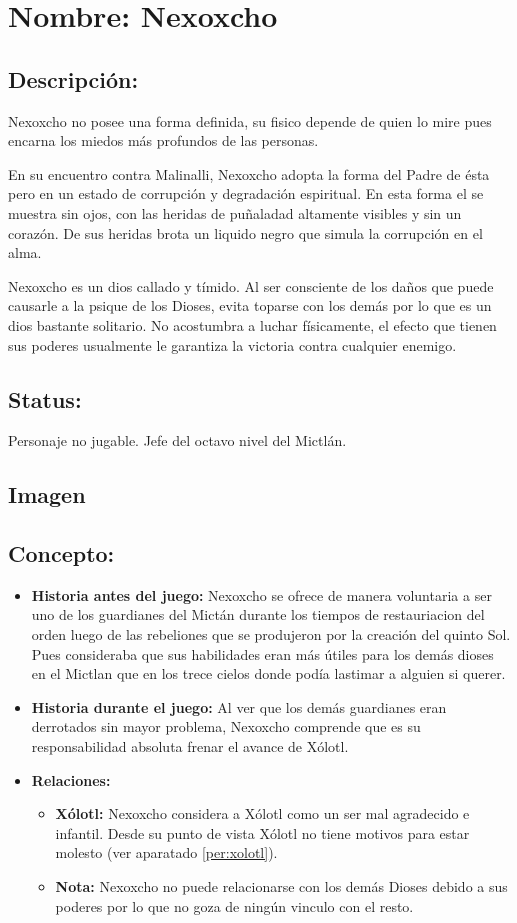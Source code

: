 \section{Nombre: Nexoxcho}  \label{per:nexoxcho}
\subsection{Descripción:}
Nexoxcho no posee una forma definida, su fisico depende de quien lo mire pues encarna los miedos más profundos de las personas.
\\
\par
En su encuentro contra Malinalli, Nexoxcho adopta la forma del Padre de ésta pero en un estado de corrupción y degradación espiritual. En esta forma el se muestra sin ojos, con las heridas de puñaladad altamente visibles y sin un corazón. De sus heridas brota un liquido negro que simula la corrupción en el alma. 
\\
\par
Nexoxcho es un dios callado y tímido. Al ser consciente de los daños que puede causarle a la psique de los Dioses, evita toparse con los demás por lo que es un dios bastante solitario. No acostumbra a luchar físicamente, el efecto que tienen sus poderes usualmente le garantiza la victoria contra cualquier enemigo.         
\subsection{Status:}
Personaje no jugable.
Jefe del octavo nivel del Mictlán.
\subsection{Imagen}
\subsection{Concepto:}
\begin{itemize}
	\item \textbf{Historia antes del juego:}
	Nexoxcho se ofrece de manera voluntaria a ser uno de los guardianes del Mictán durante los tiempos de restauriacion del orden luego de las rebeliones que se produjeron por la creación del quinto Sol. Pues consideraba que sus habilidades eran más útiles para los demás dioses en el Mictlan que en los trece cielos donde podía lastimar a alguien si querer.
	\item \textbf{Historia durante el juego:}
	Al ver que los demás guardianes eran derrotados sin mayor problema, Nexoxcho comprende que es su responsabilidad  absoluta frenar el avance de Xólotl.
	\item \textbf{Relaciones:}
	\begin{itemize}
		\item \textbf{Xólotl:} Nexoxcho considera a Xólotl como un ser mal agradecido e infantil. Desde su punto de vista Xólotl no tiene motivos para estar molesto (ver aparatado \ref{per:xolotl}). 
		\item \textbf{Nota:} Nexoxcho no puede relacionarse con los demás Dioses debido a sus poderes por lo que no goza de ningún vinculo con el resto. 
	\end{itemize}                     
\end{itemize}

